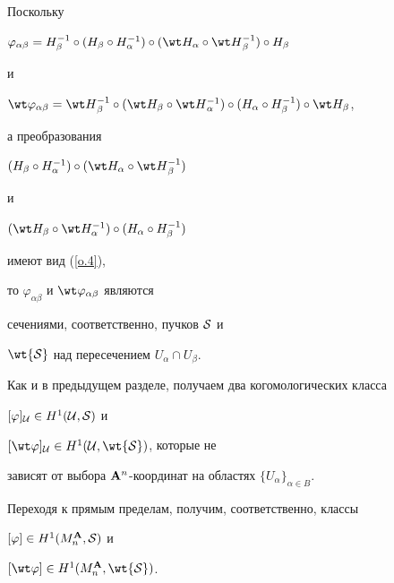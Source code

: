 Поскольку


$\varphi_{\alpha\beta} = H_{\beta}^{-1} \circ


(H_{\beta}\circ H_{\alpha}^{-1}) \circ


(\wt H_{\alpha}\circ\wt H{}_{\beta}^{-1}) \circ H_{\beta}$


и


$\wt\varphi_{\alpha\beta}=\wt H{}_{\beta}^{-1}\circ


(\wt H_{\beta}\circ \wt H{}_{\alpha}^{-1}) \circ


(H_{\alpha}\circ H_{\beta}^{-1}) \circ \wt H_{\beta}$,


а преобразования


$(H_{\beta}\circ H_{\alpha}^{-1}) \circ


(\wt H_{\alpha}\circ\wt H{}_{\beta}^{-1})$


и


$(\wt H_{\beta}\circ \wt H_{\alpha}^{-1}) \circ


(H_{\alpha}\circ H_{\beta}^{-1})$


имеют вид (\ref{o.4}),


то $\varphi_{\alpha\beta}$ и $\wt\varphi_{\alpha\beta}$ являются


сечениями, соответственно, пучков $\cal S$ и


$\wt{\cal S}$ над пересечением $U_\alpha\cap U_\beta$.


Как и в предыдущем разделе, получаем два когомологических класса


$[\varphi]_{\cal U}\in H^1({\cal U},{\cal S})$ и


$[\wt\varphi]_{\cal U}\in H^1({\cal U},\wt{\cal S})$, которые не


зависят от выбора ${\bold A}^n$-координат на областях $\{U_\alpha\}_{\alpha\in B}$.


Переходя к прямым пределам, получим, соответственно, классы


$[\varphi]\in H^1(M^{\bold A}_n,{\cal S})$ и


$[\wt\varphi] \in H^1(M^\A_n,{\wt{\cal S}})$.








